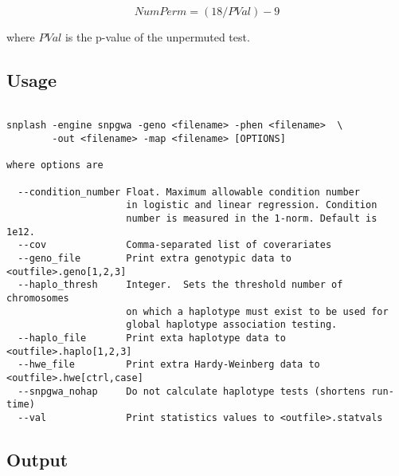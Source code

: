 \begin{equation*}
  NumPerm = \left(18/PVal\right)-9
\end{equation*}

\noindent{}where $PVal$  is the p-value of the unpermuted test.

\subsection{Usage}
\begin{verbatim}

snplash -engine snpgwa -geno <filename> -phen <filename>  \
        -out <filename> -map <filename> [OPTIONS]

where options are

  --condition_number Float. Maximum allowable condition number
                     in logistic and linear regression. Condition
                     number is measured in the 1-norm. Default is 1e12.
  --cov              Comma-separated list of coverariates
  --geno_file        Print extra genotypic data to <outfile>.geno[1,2,3]
  --haplo_thresh     Integer.  Sets the threshold number of chromosomes
                     on which a haplotype must exist to be used for
                     global haplotype association testing.
  --haplo_file       Print exta haplotype data to <outfile>.haplo[1,2,3]
  --hwe_file         Print extra Hardy-Weinberg data to <outfile>.hwe[ctrl,case]
  --snpgwa_nohap     Do not calculate haplotype tests (shortens run-time)
  --val              Print statistics values to <outfile>.statvals

\end{verbatim}

\subsection{Output}


